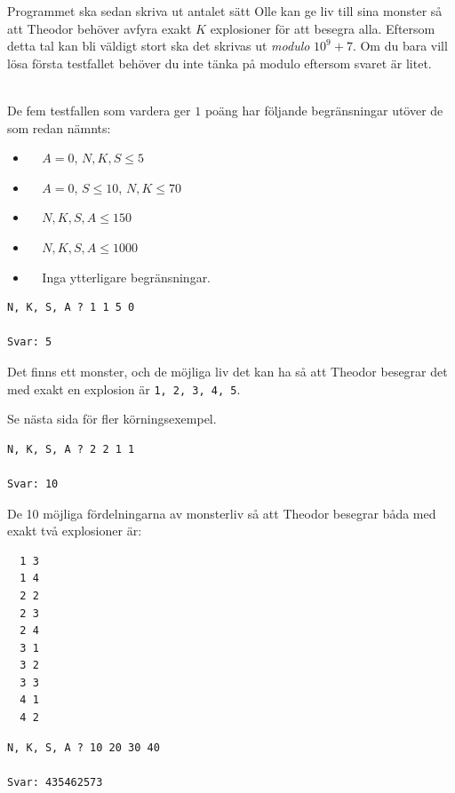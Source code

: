 Programmet ska sedan skriva ut antalet sätt Olle kan ge liv till sina monster så att Theodor behöver avfyra exakt $K$ explosioner för att besegra alla.
Eftersom detta tal kan bli väldigt stort ska det skrivas ut \textit{modulo} $10^9+7$. Om du bara vill lösa
första testfallet behöver du inte tänka på modulo eftersom svaret är litet.


\\
De fem testfallen som vardera ger $1$ poäng har följande begränsningar utöver de som redan nämnts:
\begin{itemize}
    \item[(1)] $\;\;\;\; A = 0$, $N, K, S \leq 5$
    \item[(2)] $\;\;\;\; A = 0$, $S \leq 10$, $N, K \leq 70$
    \item[(3)] $\;\;\;\; N, K, S, A \leq 150$
    \item[(4)] $\;\;\;\; N, K, S, A \leq 1000$
    \item[(5)] $\;\;\;\;$Inga ytterligare begränsningar.
\end{itemize}


\begin{verbatim}
N, K, S, A ? 1 1 5 0

Svar: 5
\end{verbatim}
 Det finns ett monster, och de möjliga liv det kan ha så att Theodor besegrar det med exakt en explosion är \verb+1, 2, 3, 4, 5+.

Se nästa sida för fler körningsexempel.

\newpage

\begin{verbatim}
N, K, S, A ? 2 2 1 1

Svar: 10
\end{verbatim}
 De 10 möjliga fördelningarna av monsterliv så att Theodor besegrar båda med exakt två explosioner är:
\begin{verbatim}
  1 3
  1 4
  2 2
  2 3
  2 4
  3 1
  3 2
  3 3
  4 1
  4 2
\end{verbatim}

\vspace{1cm}
\begin{verbatim}
N, K, S, A ? 10 20 30 40

Svar: 435462573
\end{verbatim}


